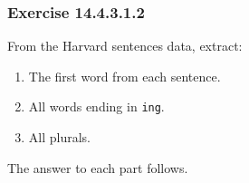 \documentclass[]{book}
\providecommand{\tightlist}{%
  \setlength{\itemsep}{0pt}\setlength{\parskip}{0pt}}
\theoremstyle{plain}
\theoremstyle{remark}
\begin{document}
\hypertarget{exercise-14.4.3.1.2}{%
\subsubsection*{\texorpdfstring{Exercise
{14.4.3.1.2}}{Exercise 14.4.3.1.2}}\label{exercise-14.4.3.1.2}}

From the Harvard sentences data, extract:

\begin{enumerate}
\def\labelenumi{\arabic{enumi}.}
\tightlist
\item
  The first word from each sentence.
\item
  All words ending in \texttt{ing}.
\item
  All plurals.
\end{enumerate}

The answer to each part follows.
\end{document}

